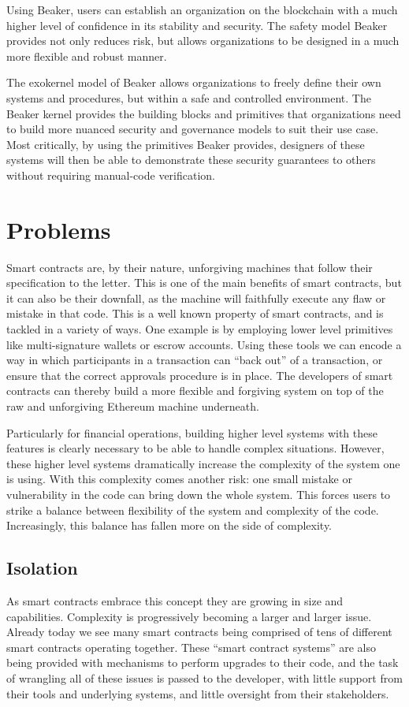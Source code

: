 \documentclass[english,a4paper]{article}
\begin{document}
Using Beaker, users can establish an organization on the blockchain with
a much higher level of confidence in its stability and security. The
safety model Beaker provides not only reduces risk, but allows
organizations to be designed in a much more flexible and robust manner.

The exokernel model of Beaker allows organizations to freely define
their own systems and procedures, but within a safe and controlled
environment. The Beaker kernel provides the building blocks and
primitives that organizations need to build more nuanced security and governance
models to suit their use case. Most critically, by using the primitives
Beaker provides, designers of these systems will then be able to
demonstrate these security guarantees to others without requiring manual-code verification.

\section{Problems}\label{problems}
Smart contracts are, by their nature, unforgiving machines that follow their
specification to the letter. This is one of the main benefits of smart
contracts, but it can also be their downfall, as the machine will faithfully
execute any flaw or mistake in that code. This is a well known property of smart
contracts, and is tackled in a variety of ways. One example is by employing
lower level primitives like multi-signature wallets or escrow accounts. Using
these tools we can encode a way in which participants in a transaction can
``back out'' of a transaction, or ensure that the correct approvals procedure is
in place. The developers of smart contracts can thereby build a more flexible
and forgiving system on top of the raw and unforgiving Ethereum machine
underneath.

Particularly for financial operations, building higher level systems with
these features is clearly necessary to be able to handle complex situations.
However, these higher level systems dramatically increase the complexity of the
system one is using. With this complexity comes another risk: one small mistake
or vulnerability in the code can bring down the whole system. This forces users
to strike a balance between flexibility of the system and complexity of the
code. Increasingly, this balance has fallen more on the side of complexity.

\subsection{Isolation}\label{isolation}
As smart contracts embrace this concept they are growing in size and
capabilities. Complexity is
progressively becoming a larger and larger issue. Already today we see many
smart
contracts being comprised of tens of different smart contracts operating
together. These ``smart contract systems'' are also being provided with
mechanisms to perform upgrades to their code, and the task of wrangling all of
these issues is
passed to the developer, with little support from their tools and underlying
systems, and little oversight from their stakeholders.
\end{document}
